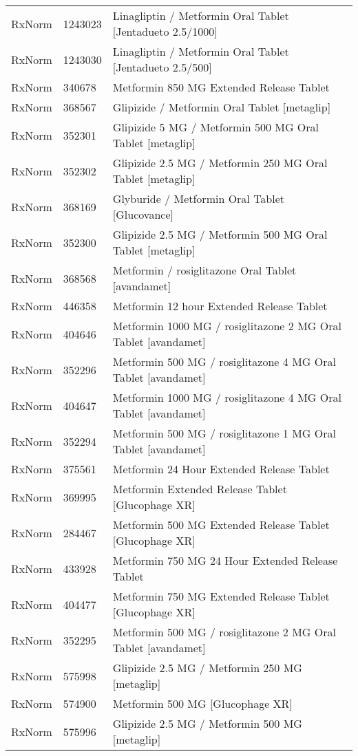 \begin{longtable}{p{}p{}p{}}
  RxNorm & 1243023 & Linagliptin / Metformin Oral Tablet [Jentadueto 2.5/1000] \\ 
  RxNorm & 1243030 & Linagliptin / Metformin Oral Tablet [Jentadueto 2.5/500] \\ 
  RxNorm & 340678 & Metformin 850 MG Extended Release Tablet \\ 
  RxNorm & 368567 & Glipizide / Metformin Oral Tablet [metaglip] \\ 
  RxNorm & 352301 & Glipizide 5 MG / Metformin 500 MG Oral Tablet [metaglip] \\ 
  RxNorm & 352302 & Glipizide 2.5 MG / Metformin 250 MG Oral Tablet [metaglip] \\ 
  RxNorm & 368169 & Glyburide / Metformin Oral Tablet [Glucovance] \\ 
  RxNorm & 352300 & Glipizide 2.5 MG / Metformin 500 MG Oral Tablet [metaglip] \\ 
  RxNorm & 368568 & Metformin / rosiglitazone Oral Tablet [avandamet] \\ 
  RxNorm & 446358 & Metformin 12 hour Extended Release Tablet \\ 
  RxNorm & 404646 & Metformin 1000 MG / rosiglitazone 2 MG Oral Tablet [avandamet] \\ 
  RxNorm & 352296 & Metformin 500 MG / rosiglitazone 4 MG Oral Tablet [avandamet] \\ 
  RxNorm & 404647 & Metformin 1000 MG / rosiglitazone 4 MG Oral Tablet [avandamet] \\ 
  RxNorm & 352294 & Metformin 500 MG / rosiglitazone 1 MG Oral Tablet [avandamet] \\ 
  RxNorm & 375561 & Metformin 24 Hour Extended Release Tablet \\ 
  RxNorm & 369995 & Metformin Extended Release Tablet [Glucophage XR] \\ 
  RxNorm & 284467 & Metformin 500 MG Extended Release Tablet [Glucophage XR] \\ 
  RxNorm & 433928 & Metformin 750 MG 24 Hour Extended Release Tablet \\ 
  RxNorm & 404477 & Metformin 750 MG Extended Release Tablet [Glucophage XR] \\ 
  RxNorm & 352295 & Metformin 500 MG / rosiglitazone 2 MG Oral Tablet [avandamet] \\ 
  RxNorm & 575998 & Glipizide 2.5 MG / Metformin 250 MG [metaglip] \\ 
  RxNorm & 574900 & Metformin 500 MG [Glucophage XR] \\ 
  RxNorm & 575996 & Glipizide 2.5 MG / Metformin 500 MG [metaglip] \\ 

\end{longtable}
